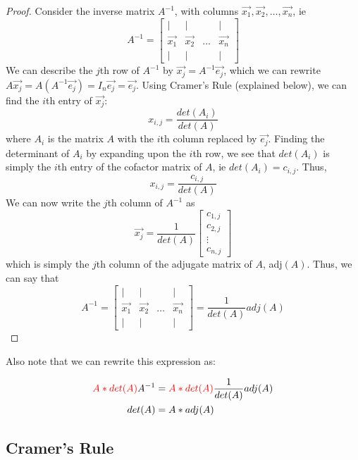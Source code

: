 \documentclass[12pt]{article}
\begin{document}
\begin{proof}
    Consider the inverse matrix $A^{-1}$, with columns $\vec{x_1}, \vec{x_2}, \dots, \vec{x_n}$, ie \[A^{-1} = 
    \begin{bmatrix} 
        | & | & &|\\
        \vec{x_1} & \vec{x_2} & \dots & \vec{x_n}\\
        | & | & &|
    \end{bmatrix}\] We can describe the $j$th row of $A^{-1}$ by $\vec{x_j} = A^{-1}\vec{e_j}$, which we can rewrite $A\vec{x_j}= A(A^{-1}\vec{e_j}) = I_n \vec{e_j} = \vec{e_j}$. Using Cramer's Rule (explained below), we can find the $i$th entry of $\vec{x_j}$: \[x_{i,j} = \frac{det(A_i)}{det(A)}\] where $A_i$ is the matrix $A$ with the $i$th column replaced by $\vec{e_j}$. Finding the determinant of $A_i$ by expanding upon the $i$th row, we see that $det(A_i)$ is simply the $i$th entry of the cofactor matrix of $A$, ie $det(A_i) = c_{i,j}$. Thus, \[x_{i,j} = \frac{c_{i,j}}{det(A)}\] We can now write the $j$th column of $A^{-1}$ as \[\vec{x_j} = \frac{1}{det(A)}\begin{bmatrix}
        c_{1,j}\\
        c_{2,j}\\
        \vdots\\
        c_{n,j}
    \end{bmatrix}\] which is simply the $j$th column of the adjugate matrix of $A$, adj$(A)$. Thus, we can say that \[A^{-1} = \begin{bmatrix} 
        | & | & & |\\
        \vec{x_1} & \vec{x_2} & \dots & \vec{x_n}\\
        | & | & & |
    \end{bmatrix} = \frac{1}{det(A)}adj(A)\]
\end{proof}

Also note that we can rewrite this expression as:

\begin{equation}
    \begin{split}
        \textcolor{red}{A*det(A)}A^{-1} &= \textcolor{red}{A*det(A)}\frac{1}{det(A)} adj(A)\\
        det(A) &= A * adj(A)\\
    \end{split}
\end{equation}

\subsection{Cramer's Rule}
\end{document}
